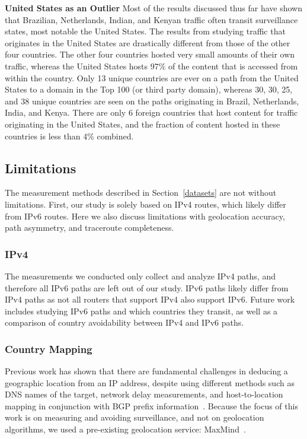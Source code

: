 {\bf United States as an Outlier}
Most of the results discussed thus far have shown that Brazilian, Netherlands, Indian, and Kenyan traffic often transit surveillance states, most notable the United States.  The results from studying traffic that originates in the United States are drastically different from those of the other four countries.  The other four countries hosted very small amounts of their own traffic, whereas the United States hosts 97\% of the content that is accessed from within the country.  Only 13 unique countries are ever on a path from the United States to a domain in the Top 100 (or third party domain), whereas 30, 30, 25, and 38 unique countries are seen on the paths originating in Brazil, Netherlands, India, and Kenya.  There are only 6 foreign countries that host content for traffic originating in the United States, and the fraction of content hosted in these countries is less than 4\% combined.

\subsection{Limitations}
The measurement methods described in Section~\ref{datasets} are not without limitations.  First, our study is solely based on IPv4 routes, which likely differ from IPv6 routes.  Here we also discuss limitations with geolocation accuracy, path asymmetry, and traceroute completeness.

\subsubsection{IPv4}
The measurements we conducted only collect and analyze IPv4 paths, and therefore all IPv6 paths are left out of our study.  IPv6 paths likely differ from IPv4 paths as not all routers that support IPv4 also support IPv6.  Future work includes studying IPv6 paths and which countries they transit, as well as a comparison of country avoidability between IPv4 and IPv6 paths. 

\subsubsection{Country Mapping}
Previous work has shown that there are fundamental challenges in deducing a geographic location from an IP address, despite using different methods such as DNS names of the target, network delay measurements, and host-to-location mapping in conjunction with BGP prefix information~\cite{padmanabhan2001investigation}.  Because the focus of this work is on measuring and avoiding surveillance, and not on geolocation algorithms, we used a pre-existing geolocation service: MaxMind~\cite{maxmind}.

